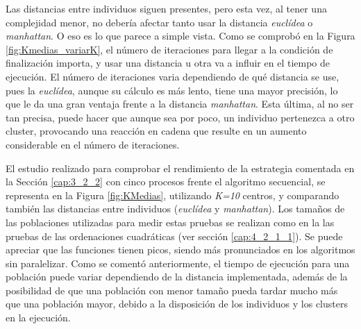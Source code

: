 		
	
		
	
		Las distancias entre individuos siguen presentes, pero esta vez, al tener una complejidad menor, no debería afectar tanto usar la distancia \textit{euclídea} o \textit{manhattan}. O eso es lo que parece a simple vista. Como se comprobó en la Figura \ref{fig:Kmedias_variarK}, el número de iteraciones para llegar a la condición de finalización importa, y usar una distancia u otra va a influir en el tiempo de ejecución. El número de iteraciones varia dependiendo de qué distancia se use, pues la \textit{euclídea}, aunque su cálculo es más lento, tiene una mayor precisión, lo que le da una gran ventaja frente a la distancia \textit{manhattan}. Esta última, al no ser tan precisa, puede hacer que aunque sea por poco, un individuo pertenezca a otro cluster, provocando una reacción en cadena que resulte en un aumento considerable en el número de iteraciones. 
		
		El estudio realizado para comprobar el rendimiento de la estrategia comentada en la Sección \ref{cap:3_2_2} con cinco procesos frente el algoritmo secuencial, se representa en la Figura \ref{fig:KMedias}, utilizando \textit{K=10} centros, y comparando también las distancias entre individuos (\textit{euclídea} y \textit{manhattan}). Los tamaños de las poblaciones utilizadas para medir estas pruebas se realizan como en la las pruebas de las ordenaciones cuadráticas (ver sección \ref{cap:4_2_1_1}). Se puede apreciar que las funciones tienen picos, siendo más pronunciados en los algoritmos sin paralelizar. Como se comentó anteriormente, el tiempo de ejecución para una población puede variar dependiendo de la distancia implementada, además de la posibilidad de que una población con menor tamaño pueda tardar mucho más que una población mayor, debido a la disposición de los individuos y los clusters en la ejecución. 						
	
